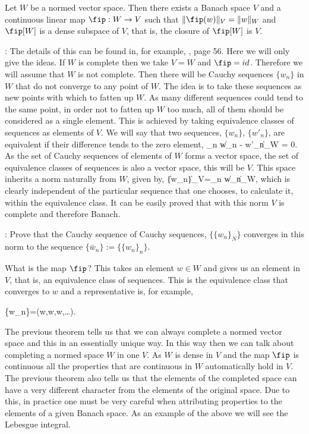 \bteo
Let $W$ be a normed vector space. Then there exists a Banach space $V$ and a continuous linear map $\fip :W \to V$ such that $\|\fip(w)\|_V=\|w\|_W$ and $\fip [W]$ is a dense subspace of $V$, that is, the closure of $\fip [W]$ is $V$.
\eteo
\espa

\pru:
The details of this can be found in, for example, \cite{Yosida}, page 56. Here we will only give the ideas. If $W$ is complete then we take $V=W$ and $\fip = id$. Therefore we will assume that $W$ is not complete. Then there will be Cauchy sequences $\{w_n\}$ in $W$ that do not converge to any point of $W$. The idea is to take these sequences as new points with which to fatten up $W$. As many different sequences could tend to the same point, in order not to fatten up $W$ too much, all of them should be considered as a single element. This is achieved by taking equivalence classes of sequences as elements of $V$. We will say that two sequences, $\{w_n\}$, $\{w'_n\}$, are equivalent if their difference tends to the zero element,
\beq
\lim_{n \to \infty} \|w_n - w'_n\|_W = 0.
\eeq
As the set of Cauchy sequences of elements of $W$ forms a vector space, the set of equivalence classes of sequences is also a vector space, this will be $V$. This space inherits a norm naturally from $W$, given by,
\beq
\|\{w_n\}\|_V=\lim_{n\to \infty} \|w_n\|_W,
\eeq
which is clearly independent of the particular sequence that one chooses, to calculate it, within the equivalence class. It can be easily proved that with this norm $V$ is complete and therefore Banach.
\espa

\ejer: Prove that the Cauchy sequence of Cauchy sequences, $\{\{w_n\}_N\}$ converges in this norm to the sequence $\{\bar{w}_n\} := \{\{w_n\}_n\}$.
\espa

What is the map $\fip$? This takes an element $w \in W$ and gives us an element in $V$, that is, an equivalence class of sequences. This is the equivalence class that converges to $w$ and a representative is, for example,

\beq
\{w_n\}=(w,w,w,\ldots).
\eeq

The previous theorem tells us that we can always complete a normed vector space and this in an essentially unique way. In this way then we can talk about completing a normed space $W$ in one $V$. As $W$ is dense in $V$ and the map $\fip$ is continuous all the properties that are continuous in $W$ automatically hold in $V$. The previous theorem also tells us that the elements of the completed space can have a very different character from the elements of the original space. Due to this, in practice one must be very careful when attributing properties to the elements of a given Banach space. As an example of the above we will see the Lebesgue integral.

